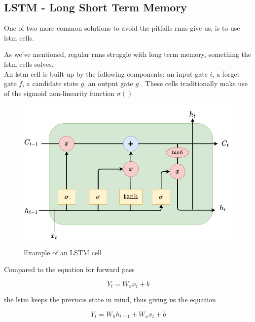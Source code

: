 \subsection{LSTM - Long Short Term Memory}

One of two more common solutions to avoid the pitfalls \acrshort{rnn}s give us, is to use \acrshort{lstm} cells. 

 As we've mentioned, regular \acrshort{rnn}s struggle with long term memory, something the \acrshort{lstm} cells solves. \\ 


An \acrshort{lstm} cell is built up by the following components: an input gate $i$, a forget gate $f$, a candidate state $g$, an output gate $g$ .
These cells traditionally make use of the sigmoid non-linearity function $\sigma()$

\begin{figure}[h]
    \centering
    \includegraphics{figures/lstmcell.png}
    \caption[scale=0.4]{Example of an LSTM cell}
    \label{fig:lstmcell}
\end{figure}

Compared to the equation for forward pass 

\begin{equation} \label{eq:cnn}
    Y_t = W_xx_t + b
\end{equation}

the \acrshort{lstm} keeps the previous state in mind, thus giving us the equation


\begin{equation} \label{eq:lstm}
    Y_t = W_hh_{t-1} + W_xx_t + b
\end{equation}

